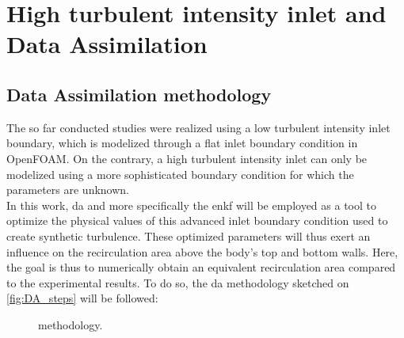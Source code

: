 \documentclass[12pt,twoside]{report}
\begin{document}
\clearpage

\chapter{High turbulent intensity inlet and Data Assimilation}
\minitoc

\clearpage

\section{Data Assimilation methodology} \label{sec:EnKF_methodology}
The so far conducted studies were realized using a low turbulent intensity inlet boundary, which is modelized through a flat inlet boundary condition in OpenFOAM. On the contrary, a high turbulent intensity inlet can only be modelized using a more sophisticated boundary condition for which the parameters are unknown. \\
In this work, \gls{da} and more specifically the \gls{enkf} will be employed as a tool to optimize the physical values of this advanced inlet boundary condition used to create synthetic turbulence. These optimized parameters will thus exert an influence on the recirculation area above the body's top and bottom walls. Here, the goal is thus to numerically obtain an equivalent recirculation area compared to the experimental results. To do so, the \gls{da} methodology sketched on \autoref{fig:DA_steps} will be followed:
\begin{figure}[h!]
    \centering
    
    \caption{ methodology.}
    \label{fig:DA_steps}
\end{figure}
\end{document}
